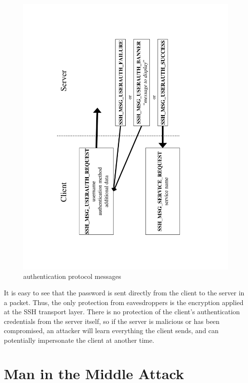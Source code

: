 \begin{figure}
\begin{centering}
\includegraphics[clip,scale=0.4,angle=270]{ssh_auth}
\par\end{centering}

\caption{\label{fig:ssh-auth} authentication protocol messages}

\end{figure}


It is easy to see that the password is sent directly from the client
to the server in a packet. Thus, the only protection from eavesdroppers
is the encryption applied at the SSH transport layer. There is no
protection of the client's authentication credentials from the server
itself, so if the server is malicious or has been compromised, an
attacker will learn everything the client sends, and can potentially
impersonate the client at another time.


\section{Man in the Middle Attack \label{sub:Man-in-the-Middle}}

